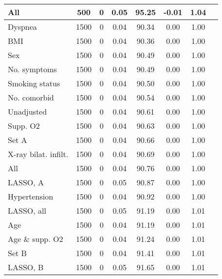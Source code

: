 \documentclass{article}
\begin{document}
{\begin{longtable}{lccccccc}
All & 500 & 0 & 0.05 & 95.25 & -0.01 & 1.04\\ \midrule
Dyspnea & 1500 & 0 & 0.04 & 90.34 & 0.00 & 1.00\\
BMI & 1500 & 0 & 0.04 & 90.36 & 0.00 & 1.00\\
Sex & 1500 & 0 & 0.04 & 90.49 & 0.00 & 1.00\\
No. symptoms & 1500 & 0 & 0.04 & 90.49 & 0.00 & 1.00\\
Smoking status & 1500 & 0 & 0.04 & 90.50 & 0.00 & 1.00\\
No. comorbid & 1500 & 0 & 0.04 & 90.54 & 0.00 & 1.00\\
Unadjusted & 1500 & 0 & 0.04 & 90.61 & 0.00 & 1.00\\
Supp. O2 & 1500 & 0 & 0.04 & 90.63 & 0.00 & 1.00\\
Set A & 1500 & 0 & 0.04 & 90.66 & 0.00 & 1.00\\
X-ray bilat. infilt. & 1500 & 0 & 0.04 & 90.69 & 0.00 & 1.00\\
All & 1500 & 0 & 0.04 & 90.76 & 0.00 & 1.00\\
LASSO, A & 1500 & 0 & 0.05 & 90.87 & 0.00 & 1.00\\
Hypertension & 1500 & 0 & 0.04 & 90.92 & 0.00 & 1.00\\
LASSO, all & 1500 & 0 & 0.05 & 91.19 & 0.00 & 1.01\\
Age & 1500 & 0 & 0.04 & 91.19 & 0.00 & 1.01\\
Age \& supp. O2 & 1500 & 0 & 0.04 & 91.24 & 0.00 & 1.01\\
Set B & 1500 & 0 & 0.04 & 91.41 & 0.00 & 1.01\\
LASSO, B & 1500 & 0 & 0.05 & 91.65 & 0.00 & 1.01\\
\bottomrule
\hline
\end{longtable}
}

\clearpage
\end{document}
